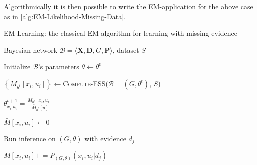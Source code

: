 \documentclass[11pt]{article}
\begin{document}
\begin{article}
Algorithmically it is then possible to write the EM-application for
the above case as in \ref{alg:EM-Likelihood-Missing-Data}.

\algrenewcommand\algorithmicindent{1.5em}%

\begin{algorithm*}[h!]
\caption{EM-Learning: the classical EM algorithm for learning with missing evidence}
\label{alg:EM-Likelihood-Missing-Data}
\vspace{-10pt}
\begin{multicols}{2}
\begin{algorithmic}[1] 
\Require Bayesian network $\mathcal{B}=\langle \mathbf{X},\mathbf{D}, G, \mathbf{P} \rangle$, dataset $S$ 

\State Initialize $\mathcal{B}$'s parameters $\theta \leftarrow \theta^0$

  \State $\left\{ \bar{M}_{\theta^t}[x_{i},u_{i}]\right\} \leftarrow$\textsc{Compute-ESS}($\mathcal{B}=(G,\theta^{t})$, $S$)



      \State $\theta_{x_{i}|u_{i}}^{t+1}=\frac{\bar{M}_{\theta^{t}}[x_{i},u_{i}]}{\bar{M}_{\theta^{t}}[u]}$
    \EndFor
  \EndFor
\EndFor
\EndProcedure
\\

   \State $\bar{M}[x_{i},u_{i}]\leftarrow 0$
  \EndFor
\EndFor

    \State Run inference on $(G,\theta)$ with evidence $d_{j}$

        \State $\bar{M}[x_{i},u_{i}] \mathrel{{+}{=}} P_{(G,\theta)}(x_{i},u_{i}|d_{j})$
      \EndFor
    \EndFor
\EndFor
\EndFunction
\end{algorithmic}
\end{multicols}
\end{algorithm*}



\end{article}
\end{document}

